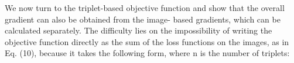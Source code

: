 We now turn to the triplet-based objective function and show
that the overall gradient can also be obtained from the image-
based gradients, which can be calculated separately. The difficulty
lies on the impossibility of writing the objective function directly
as the sum of the loss functions on the images, as in Eq. (10),
because it takes the following form, where n is the number of
triplets:

